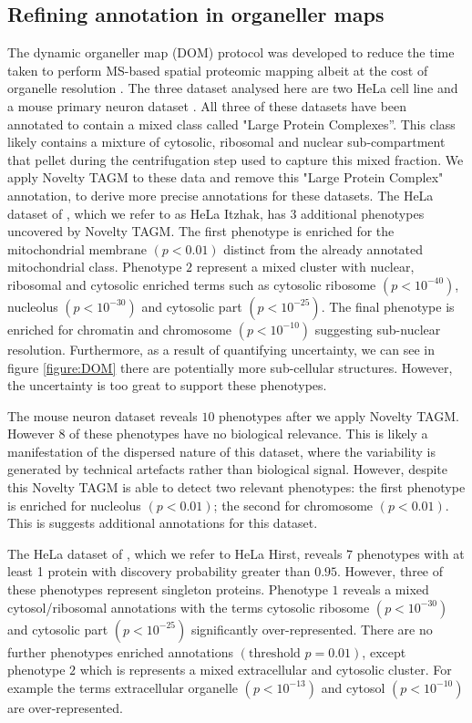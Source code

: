 \documentclass[12pt,english]{article}
\begin{document}
\subsection{Refining annotation in organeller maps}
The dynamic organeller map (DOM) protocol was developed to reduce the time taken to perform MS-based spatial proteomic mapping albeit at the cost of organelle resolution \citep{Itzhak:2016,Gatto:2018}. The three dataset analysed here are two HeLa cell line \citep{Itzhak:2016, Hirst:2018} and a mouse primary neuron dataset \citep{Itzhak::2017}. All three of these datasets have been annotated to contain a mixed class called "Large Protein Complexes''. This class likely contains a mixture of cytosolic, ribosomal and nuclear sub-compartment that pellet during the centrifugation step used to capture this mixed fraction. We apply Novelty TAGM to these data and remove this "Large Protein Complex" annotation, to derive more precise annotations for these datasets. The HeLa dataset of \cite{Itzhak:2016}, which we refer to as HeLa Itzhak, has $3$ additional phenotypes uncovered by Novelty TAGM. The first phenotype is enriched for the mitochondrial membrane $(p < 0.01)$ distinct from the already annotated mitochondrial class. Phenotype $2$ represent a mixed cluster with nuclear, ribosomal and cytosolic enriched terms such as cytosolic ribosome $(p < 10^{-40})$, nucleolus $(p < 10^{-30})$ and cytosolic part $(p < 10^{-25})$. The final phenotype is enriched for chromatin and chromosome $(p < 10^{-10})$ suggesting sub-nuclear resolution. Furthermore, as a result of quantifying uncertainty, we can see in figure \ref{figure:DOM} there are potentially more sub-cellular structures. However, the uncertainty is too great to support these phenotypes. 

The mouse neuron dataset reveals $10$ phenotypes after we apply Novelty TAGM. However $8$ of these phenotypes have no biological relevance. This is likely a manifestation of the dispersed nature of this dataset, where the variability is generated by technical artefacts rather than biological signal. However, despite this Novelty TAGM is able to detect two relevant phenotypes: the first phenotype is enriched for nucleolus $(p < 0.01)$; the second for chromosome $(p < 0.01)$. This is suggests additional annotations for this dataset.

The HeLa dataset of \cite{Hirst:2018}, which we refer to HeLa Hirst, reveals $7$ phenotypes with at least 1 protein with discovery probability greater than $0.95$. However, three of these phenotypes represent singleton proteins. Phenotype $1$ reveals a mixed cytosol/ribosomal annotations with the terms cytosolic ribosome $(p < 10^{-30})$ and cytosolic part $(p < 10^{-25})$ significantly over-represented. There are no further phenotypes enriched annotations $(\text{threshold } p = 0.01)$, except phenotype $2$ which is represents a mixed extracellular and cytosolic cluster. For example the terms extracellular organelle $(p <10^{-13})$ and cytosol $(p < 10^{-10})$ are over-represented.
\end{document}
